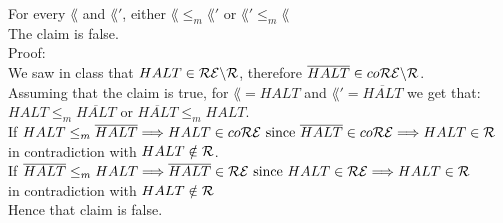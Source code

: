 For every $\lang$ and $\lang'$, either $\lang \leq_m \lang'$ or $\lang' \leq_m \lang$ \\

The claim is false. \\

Proof: \\
We saw in class that $HALT \in \mathcal{R}\mathcal{E} \backslash \mathcal{R}$, therefore $\overline{HALT} \in co\mathcal{R}\mathcal{E} \backslash \mathcal{R}$. \\
Assuming that the claim is true, for $\lang=HALT$ and $\lang'=\overline{HALT}$ we get that: \\
$HALT \leq_m \overline{HALT}$ or $\overline{HALT} \leq_m HALT$. \\

If $HALT \leq_m \overline{HALT} \\
    \Longrightarrow HALT \in co\mathcal{R}\mathcal{E} \text{ since } \overline{HALT} \in co\mathcal{R}\mathcal{E} \\
    \Longrightarrow HALT \in \mathcal{R}$ \\
in contradiction with $HALT \notin \mathcal{R}$. \\

If $\overline{HALT} \leq_m HALT \\
    \Longrightarrow \overline{HALT} \in \mathcal{R}\mathcal{E} \text{ since } HALT \in \mathcal{R}\mathcal{E} \\
    \Longrightarrow HALT \in \mathcal{R}$ \\
in contradiction with $HALT \notin \mathcal{R}$ \\

Hence that claim is false. \\

